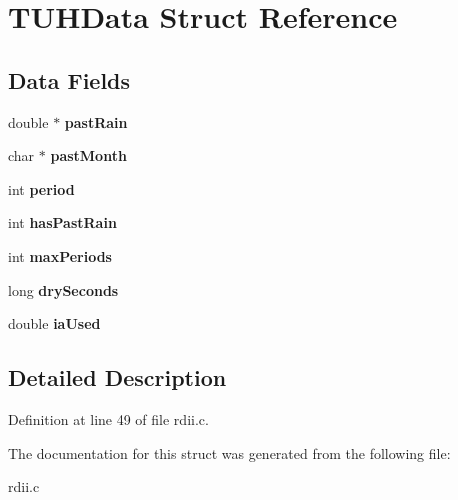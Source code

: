 \hypertarget{struct_t_u_h_data}{}\section{T\+U\+H\+Data Struct Reference}
\label{struct_t_u_h_data}
\subsection*{Data Fields}
\begin{DoxyCompactItemize}
\item 
\mbox{\label{struct_t_u_h_data_a0daab909a948df41b4e614b884a73906}} 
double $\ast$ {\bfseries past\+Rain}
\item 
\mbox{\label{struct_t_u_h_data_a2b2e49985b7ab1ac78b0e3f60b9b5351}} 
char $\ast$ {\bfseries past\+Month}
\item 
\mbox{\label{struct_t_u_h_data_a486233493fc0e05fe1bdbe7b7e5d0f1e}} 
int {\bfseries period}
\item 
\mbox{\label{struct_t_u_h_data_ab110dc00d8278d6bc078061b80c0c325}} 
int {\bfseries has\+Past\+Rain}
\item 
\mbox{\label{struct_t_u_h_data_a4473f4771849677ead252fa15a708a35}} 
int {\bfseries max\+Periods}
\item 
\mbox{\label{struct_t_u_h_data_adacd93b49ee4b0b0a1dc57d0795b1aed}} 
long {\bfseries dry\+Seconds}
\item 
\mbox{\label{struct_t_u_h_data_a0c0377ff75dcef295a1d92cfbb0c23c5}} 
double {\bfseries ia\+Used}
\end{DoxyCompactItemize}


\subsection{Detailed Description}


Definition at line 49 of file rdii.\+c.



The documentation for this struct was generated from the following file\+:\begin{DoxyCompactItemize}
\item 
rdii.\+c\end{DoxyCompactItemize}
